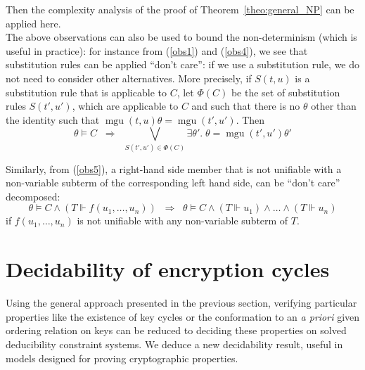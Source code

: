 \documentclass[acmtocl,acmnow]{acmtrans2m}
\newcommand{\mgu}{\operatorname{mgu}}
\newcommand{\dedsyss}[1]{deducibility constraint systems}
\begin{document}
Then the complexity analysis of
the proof of Theorem~\ref{theo:general_NP} can be applied here.
\\

The above observations can also be used to bound the non-determinism
(which is useful in practice): 
for instance from (\ref{obs1}) and (\ref{obs4}), we see that
substitution rules can be applied ``don't care'': if we use
a substitution rule, we do not need to consider other alternatives.  
More precisely, if $S(t,u)$ is a substitution rule that is applicable to
$C$, let $\Phi(C)$ be the set of substitution rules $S(t',u')$, which
are applicable to $C$ and such that there is no $\theta$ other than the identity
such that
$\mgu(t,u)\theta = \mgu(t',u')$. 
Then
\[ \theta \models C \;\;\Longrightarrow \;\; \displaystyle{\bigvee_{S(t',u')\in \Phi(C)} \exists \theta'. \; \theta= \mgu(t',u')\theta'} \]






Similarly, from (\ref{obs5}), a right-hand side member
that is not unifiable with a non-variable subterm of the corresponding
left hand side, can be ``don't care'' decomposed:
\[ \theta \models C\wedge (T\Vdash f(u_1,\ldots,u_n)) \;\; \Longrightarrow \;\;
\theta \models C\wedge (T\Vdash u_1)\wedge\ldots\wedge (T\Vdash u_n) \]
if $f(u_1,\ldots,u_n)$ is not unifiable with any non-variable subterm of $T$.
































\section{Decidability of encryption cycles}\label{sec:cycles}
Using the general approach presented in the
previous section, verifying particular properties like the existence
of key cycles or the conformation to an \emph{a priori} given ordering
relation on keys can be reduced to deciding these properties on solved
\dedsyss{}. We deduce a new decidability result, useful in
models designed for proving cryptographic properties. 
\end{document}
